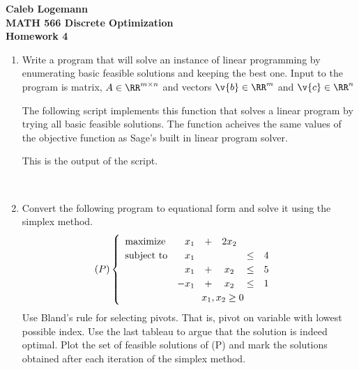 \documentclass[11pt, oneside]{article}
\begin{document}
\noindent \textbf{\Large{Caleb Logemann \\
MATH 566 Discrete Optimization\\
Homework 4
}}

%
\begin{enumerate}
  \item %
    Write a program that will solve an instance of linear programming by
    enumerating basic feasible solutions and keeping the best one.
    Input to the program is matrix, $A \in \RR^{m \times n}$ and vectors
    $\v{b} \in \RR^m$ and $\v{c} \in \RR^n$

    The following script implements this function that solves a linear
    program by trying all basic feasible solutions.
    The function acheives the same values of the objective function as Sage's
    built in linear program solver.
    
    This is the output of the script.
    \begin{verbatim}
        
    \end{verbatim}

  \item %
    Convert the following program to equational form and solve it using the
    simplex method.
    \[
      (P) 
      \begin{cases} 
        \begin{array}{lrccccc} 
          \text{maximize}    &x_1  &+  &2x_2 &     &   \\
          \text{subject to}  &x_1  &   &     &\leq & 4 \\
                             &x_1  &+  &x_2  &\leq & 5 \\
                             &-x_1 &+  &x_2  &\leq & 1 \\
        \end{array}\\
        \text{ \hskip 8em } x_1,x_2 \geq 0
      \end{cases}
    \]
    Use Bland's rule for selecting pivots.
    That is, pivot on variable with lowest possible index.
    Use the last tableau to argue that the solution is indeed optimal.
    Plot the set of feasible solutions of (P) and mark the solutions obtained
    after each iteration of the simplex method.


\end{enumerate}
\end{document}
